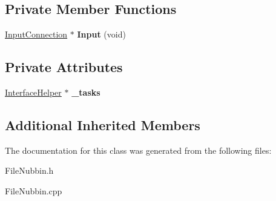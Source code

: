 \subsection*{Private Member Functions}
\begin{DoxyCompactItemize}
\item 
\mbox{\label{class_file_nubbin_a9eeee47cc884ff7018c2aad7f5fef783}} 
\hyperlink{class_generic_provider_1_1_input_connection}{Input\+Connection} $\ast$ {\bfseries Input} (void)
\end{DoxyCompactItemize}
\subsection*{Private Attributes}
\begin{DoxyCompactItemize}
\item 
\mbox{\label{class_file_nubbin_a8d5f1d19f134e6b2b15899080c8cbb78}} 
\hyperlink{class_interface_helper}{Interface\+Helper} $\ast$ {\bfseries \+\_\+tasks}
\end{DoxyCompactItemize}
\subsection*{Additional Inherited Members}


The documentation for this class was generated from the following files\+:\begin{DoxyCompactItemize}
\item 
File\+Nubbin.\+h\item 
File\+Nubbin.\+cpp\end{DoxyCompactItemize}
